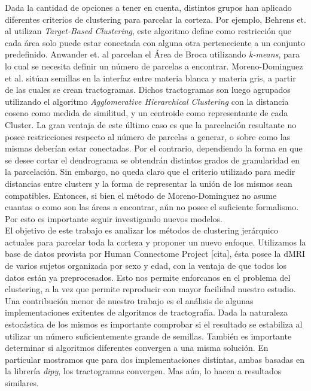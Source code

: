Dada la cantidad de opciones a tener en cuenta, distintos grupos han aplicado
diferentes criterios de clustering para parcelar la corteza. Por ejemplo, Behrens
et. al \cite{Behrens2003} utilizan \textit{Target-Based Clustering}, este algoritmo
define como restricci\'on que cada \'area solo puede estar conectada con alguna
otra perteneciente a un conjunto predefinido. Anwander et. al \cite{Anwander2006} 
parcelan el \'Area de Broca utilizando \textit{k-means}, para lo cual se necesita
definir un n\'umero de parcelas a encontrar. Moreno-Dominguez et al. 
\cite{Moreno-Dominguez2014} sit\'uan semillas en la interfaz entre materia blanca
y materia gris, a partir de las cuales se crean tractogramas. Dichos tractogramas
son luego agrupados utilizando el algoritmo \textit{Agglomerative Hierarchical
Clustering} con la distancia coseno como medida de similitud, y un centroide como
representante de cada Cluster. La gran ventaja de este \'ultimo caso es que la
parcelaci\'on resultante no posee restricciones respecto al n\'umero de parcelas
a generar, o sobre como las mismas deber\'ian estar conectadas. Por el contrario,
dependiendo la forma en que se desee cortar el dendrograma se obtendr\'an
distintos grados de granularidad en la parcelaci\'on. Sin embargo, no queda claro
que el criterio utilizado para medir distancias entre clusters y la forma de
representar la uni\'on de los mismos sean compatibles. Entonces, si bien el
m\'etodo de Moreno-Dominguez no asume cuantas o como son las \'areas a encontrar,
a\'un no posee el suficiente formalismo. Por esto es importante seguir investigando
nuevos modelos.  \\

El objetivo de este trabajo es analizar los m\'etodos de clustering jer\'arquico
actuales para parcelar toda la corteza y proponer un nuevo enfoque. Utilizamos
la base de datos provista por Human Connectome Project [cita], \'esta posee la
dMRI de varios sujetos organizada por sexo y edad, con la ventaja de que todos
los datos est\'an ya preprocesados. Esto nos permite enforcanos en el problema
del clustering, a la vez que permite reproducir con mayor facilidad nuestro 
estudio. \\

Una contribuci\'on menor de nuestro trabajo es el an\'alisis de algunas 
implementaciones exitentes de algoritmos de tractograf\'ia. Dada la naturaleza
estoc\'astica de los mismos es importante comprobar si el resultado se estabiliza
al utilizar un n\'umero suficientemente grande de semillas. Tambi\'en es importante
determinar si algoritmos diferentes convergen a una misma soluci\'on.
En particular mostramos que para dos implementaciones distintas, ambas basadas 
en la librer\'ia \textit{dipy}, los tractogramas convergen. Mas a\'un, lo hacen
a resultados similares. \\

